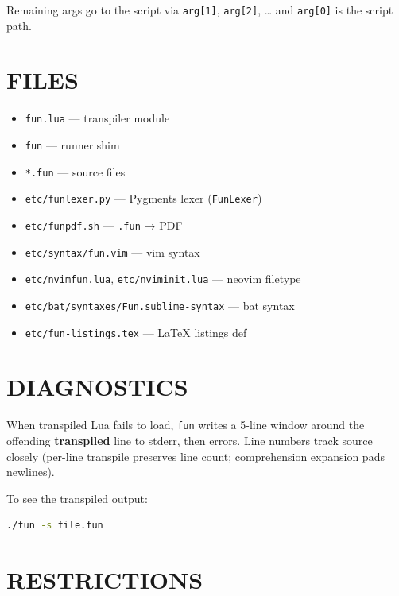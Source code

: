 \documentclass[10pt,twocolumn]{article}
\providecommand{\passthrough}[1]{#1}
\providecommand{\tightlist}{\setlength{\itemsep}{0pt}\setlength{\parskip}{0pt}}
\begin{document}
Remaining args go to the script via \passthrough{\lstinline!arg[1]!},
\passthrough{\lstinline!arg[2]!}, \ldots{} and
\passthrough{\lstinline!arg[0]!} is the script path.

\section{FILES}\label{files}

\begin{itemize}
\tightlist
\item
  \passthrough{\lstinline!fun.lua!} --- transpiler module
\item
  \passthrough{\lstinline!fun!} --- runner shim
\item
  \passthrough{\lstinline!*.fun!} --- source files
\item
  \passthrough{\lstinline!etc/funlexer.py!} --- Pygments lexer
  (\passthrough{\lstinline!FunLexer!})
\item
  \passthrough{\lstinline!etc/funpdf.sh!} ---
  \passthrough{\lstinline!.fun!} → PDF
\item
  \passthrough{\lstinline!etc/syntax/fun.vim!} --- vim syntax
\item
  \passthrough{\lstinline!etc/nvimfun.lua!},
  \passthrough{\lstinline!etc/nviminit.lua!} --- neovim filetype
\item
  \passthrough{\lstinline!etc/bat/syntaxes/Fun.sublime-syntax!} --- bat
  syntax
\item
  \passthrough{\lstinline!etc/fun-listings.tex!} --- LaTeX listings def
\end{itemize}

\section{DIAGNOSTICS}\label{diagnostics}

When transpiled Lua fails to load, \passthrough{\lstinline!fun!} writes
a 5-line window around the offending \textbf{transpiled} line to stderr,
then errors. Line numbers track source closely (per-line transpile
preserves line count; comprehension expansion pads newlines).

To see the transpiled output:

\begin{lstlisting}[language=bash]
./fun -s file.fun
\end{lstlisting}

\section{RESTRICTIONS}\label{restrictions}
\end{document}
